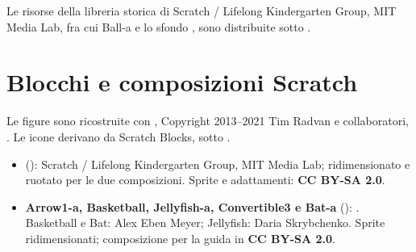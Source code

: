 Le risorse della libreria storica di Scratch / Lifelong Kindergarten Group, MIT Media Lab, fra cui Ball-a e lo sfondo , sono distribuite sotto .

\section*{Blocchi e composizioni Scratch}
Le figure sono ricostruite con , Copyright 2013--2021 Tim Radvan e collaboratori, . Le icone derivano da Scratch Blocks, sotto .

\begin{itemize}[leftmargin=*,itemsep=3pt,topsep=3pt,parsep=0pt]
\item {} (): Scratch / Lifelong Kindergarten Group, MIT Media Lab; ridimensionato e ruotato per le due composizioni. Sprite e adattamenti: \textbf{CC BY-SA 2.0}.
\item \textbf{Arrow1-a, Basketball, Jellyfish-a, Convertible3 e Bat-a} (): . Basketball e Bat: Alex Eben Meyer; Jellyfish: Daria Skrybchenko. Sprite ridimensionati; composizione per la guida in \textbf{CC BY-SA 2.0}.
\end{itemize}

